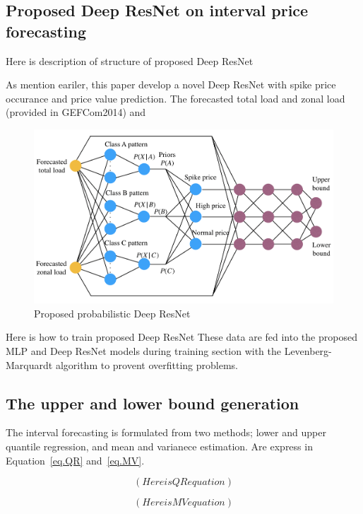 \documentclass[review]{elsarticle}
\begin{document}
    \subsection{Proposed Deep ResNet on interval price forecasting}
      Here is description of structure of proposed Deep ResNet


      As mention eariler, this paper develop a novel Deep ResNet with spike price occurance and price  value prediction.
      The forecasted total load and zonal load (provided in GEFCom2014) and

      \begin{figure}[H]
        \includegraphics[width=12cm]{proposed_PDRNN}
        \caption{Proposed probabilistic Deep ResNet}
        \label{Fig:proposed_PDRNN}
        \centering
      \end{figure}

      Here is how to train proposed Deep ResNet
      These data are fed into the proposed MLP and Deep ResNet models during training section with the Levenberg-Marquardt algorithm to provent overfitting problems.

    \subsection{The upper and lower bound generation}

      The interval forecasting is formulated from two methods; lower and upper quantile regression, and mean and varianece estimation. Are express in Equation~\ref{eq.QR} and~\ref{eq.MV}.

      \begin{equation}
        (Here is QR equation)
        \label{eq.QR}
      \end{equation}

      \begin{equation}
        (Here is MV equation)
        \label{eq.MV}
      \end{equation}
\end{document}
